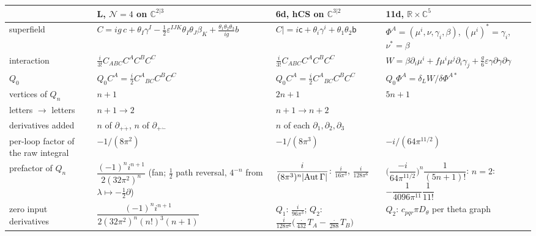 \documentclass[10pt,a4paper]{article}
\numberwithin{equation}{section}
\begin{document}
{\small
\renewcommand{\arraystretch}{1.4}
\begin{longtable}{@{}>{\raggedright\arraybackslash}p{2.2cm}>{\raggedright\arraybackslash}p{4.5cm}>{\raggedright\arraybackslash}p{4.3cm}>{\raggedright\arraybackslash}p{4.4cm}@{}}
\toprule
 & \textsf{L}, $\mathcal N=4$ on $\mathbb C^{2|3}$ & \textsf{6d}, hCS on $\mathbb C^{3|2}$ & \textsf{11d}, $\mathbb R\times\mathbb C^5$\\
\midrule\endhead
superfield & $C=ig\,c+\theta_I\gamma^I-\frac12\varepsilon^{IJK}\theta_I\theta_J\beta_K+\frac{\theta_1\theta_2\theta_3}{ig}b$ & $C|=i\mathsf c+\theta_i\gamma^i+\theta_1\theta_2\mathsf b$ & $\Phi^A=(\mu^i,\nu,\gamma_i,\beta)$, $(\mu^i)^*=\gamma_i$, $\nu^*=\beta$\\
interaction & $\frac i{3!}C_{ABC}C^AC^BC^C$ & $\frac i{3!}C_{ABC}C^AC^BC^C$ & $W=\beta\partial_i\mu^i+f\mu^i\mu^j\partial_i\gamma_j+\frac g6\varepsilon\gamma\partial\gamma\partial\gamma$\\
$Q_0$ & $Q_0C^A=\frac i2C^A{}_{BC}C^BC^C$ & $Q_0C^A=\frac i2C^A{}_{BC}C^BC^C$ & $Q_0\Phi^A=\delta_LW/\delta\Phi^{A*}$\\
vertices of $Q_n$ & $n+1$ & $2n+1$ & $5n+1$\\
letters $\to$ letters & $n+1\to2$ & $n+1\to n+2$ & \\
derivatives added & $n$ of $\partial_{+\dot+}$, $n$ of $\partial_{+\dot-}$ & $n$ of each $\partial_1,\partial_2,\partial_3$ & \\
per-loop factor of the raw integral & $-1/(8\pi^2)$ & $-1/(8\pi^3)$ & $-i/(64\pi^{11/2})$\\
prefactor of $Q_n$ & $\dfrac{(-1)^ni^{n+1}}{2(32\pi^2)^n}$ (fan; $\frac12$ path reversal, $4^{-n}$ from $\lambda\mapsto-\frac12\partial$) & $\dfrac i{(8\pi^3)^n|{\rm Aut}\,\Gamma|}$: $\frac i{16\pi^3}$, $\frac i{128\pi^6}$ & $\Big(\dfrac{-i}{64\pi^{11/2}}\Big)^n\dfrac1{(5n+1)!}$: $n=2$: $-\dfrac1{4096\pi^{11}}\dfrac1{11!}$\\
zero input derivatives & $\dfrac{(-1)^ni^{n+1}}{2(32\pi^2)^n(n!)^3(n+1)}$ & $Q_1$: $\frac i{96\pi^3}$; $Q_2$: $\frac i{128\pi^6}\big(\frac{\cdot}{432}T_A-\frac{\cdot}{288}T_B\big)$ & $Q_2$: $c_{pqr}\pi D_\theta$ per theta graph\\
\bottomrule
\end{longtable}}
\end{document}
